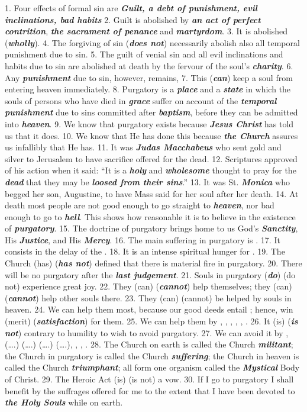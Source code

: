 \documentclass[a4paper,14pt]{memoir}
\newcommand\answer[1]{\textbf{\textit{#1}}}
\begin{document}
1. Four effects of formal sin are \answer{Guilt, a debt of punishment, evil inclinations, bad habits}
2.   Guilt
is  abolished  by  \answer{an act of perfect contrition}, \answer{the sacrament of penance}  and  \answer{martyrdom}. 
3.   It  is  abolished 
(\answer{wholly}).
4.  The forgiving of sin (\answer{does  not})  necessarily  abolish
also all temporal punishment due to sin.
5.  The guilt of venial sin and  all
evil inclinations and habits due to  sin  are  abolished  at  death  by  the
fervour of the soul's \answer{charity}.
6.  Any \answer{punishment} due to  sin,  however,  remains,
7. This (\answer{can}) keep a soul  from  entering  heaven  immediately. 
8. 
Purgatory is a \answer{place} and a \answer{state} in which the souls of  persons  who  have
died in \answer{grace} suffer on account of the \answer{temporal punishment} due to sins  committed  after
\answer{baptism}, before they can be admitted into \answer{heaven}.
9.  We know  that  purgatory
exists because \answer{Jesus Christ} has told us that it does.
10.   We  know  that  He  has
done this because \answer{the Church} assures us infallibly  that  He  has. 
11.   It  was
\answer{Judas Macchabeus} who sent gold and silver to Jerusalem to have sacrifice  offered  for
the dead.
12.  Scriptures approved of his action  when  it  said:  “It  is  a
\answer{holy} and \answer{wholesome} thought to pray for the \answer{dead} that they may  be  \answer{loosed from their sins}.”
13. It was St. \answer{Monica} who begged her son, Augustine, to have Mass  said  for
her soul after her death.
14.  At death most people are not  good  enough  to
go straight to \answer{heaven}, nor bad enough  to  go  to  \answer{hell}.  This  shows  how
reasonable it is to believe in the existence of \answer{purgatory}. 
15.   The  doctrine
of purgatory brings home to us God's \answer{Sanctity}, His  \answer{Justice},  and  His  \answer{Mercy}.
16. The main suffering in purgatory is \answer{}.
17.  It consists in the  delay
of the \answer{}.
18.  It is an intense spiritual hunger  for  \answer{}. 
19.   The
Church (has) (\answer{has not}) defined that there is  material  fire  in  purgatory.
20. There will be no purgatory after the  \answer{last judgement}. 
21.   Souls  in  purgatory
(\answer{do})  (do  not)  experience  great  joy. 
22.   They  (can)   (\answer{cannot})   help
themselves; they (can) (\answer{cannot}) help  other  souls  there. 
23.   They  (can)
(cannot) be helped by souls in heaven.
24.  We can help  them  most,  because
our good deeds entail \answer{}; hence, win (merit)  (\answer{satisfaction})  for  them.
25. We can help them by \answer{}, \answer{}, \answer{}, \answer{}, \answer{}, \answer{}. 
26. 
It (is) (\answer{is not}) contrary to humility to wish to  avoid  purgatory. 
27.   We
can avoid it by \answer{}, (….) (….) (….) (….),  \answer{},  \answer{},  \answer{}. 
28. 
The Church on earth is called the Church \answer{militant}; the Church in purgatory  is
called the Church \answer{suffering}; the Church in heaven is called the Church  \answer{triumphant};
 all form one organism called the \answer{Mystical} Body of Christ.
29.  The Heroic  Act
(is) (is not) a vow.
30.  If I  go  to  purgatory  I  shall  benefit  by  the
suffrages offered for me to the extent that I have been  devoted  to  \answer{the Holy Souls}
while on earth.
\end{document}
